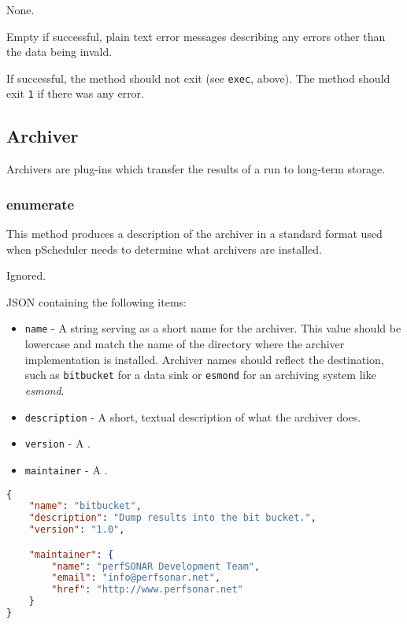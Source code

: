 \documentclass[10pt,titlepage]{article}
\begin{document}
 None.

 Empty if successful, plain text error
messages describing any errors other than the data being invald.

 If successful, the method should not exit
(see {\tt exec}, above).  The method should exit {\tt 1} if there was
any error.



%
%
\subsection{Archiver}
Archivers are plug-ins which transfer the results of a run to
long-term storage.




\subsubsection{enumerate}

This method produces a description of the archiver in a standard
format used when pScheduler needs to determine what archivers are
installed.

 Ignored.

 JSON containing the following items:
\begin{itemize}
\item{\tt name} - A string serving as a short name for the archiver.
  This value should be lowercase and match the name of the directory
  where the archiver implementation is installed.  Archiver names
  should reflect the destination, such as {\tt bitbucket} for a data
  sink or {\tt esmond} for an archiving system like {\it esmond}.
\item{\tt description} - A short, textual description of what the
  archiver does.
\item{\tt version} - A .
\item{\tt maintainer} - A .
\end{itemize}

\example
\begin{lstlisting}[language=json,firstnumber=1]
{
    "name": "bitbucket",
    "description": "Dump results into the bit bucket.",
    "version": "1.0",

    "maintainer": {
        "name": "perfSONAR Development Team",
        "email": "info@perfsonar.net",
        "href": "http://www.perfsonar.net"
    }
}
\end{lstlisting}
\end{document}
